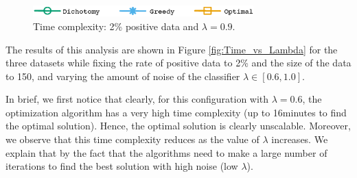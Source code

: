 


\begin{figure}[H]
\begin{centering}
\includegraphics[width=8.5cm]{imgs/legend2}
\par\end{centering}
\begin{centering}
\par\end{centering}
\caption{Time complexity: 2\% positive data and  $\lambda=0.9$.}
\label{fig:Time_vs_Data}
\end{figure}



  The results of this analysis are shown in Figure \ref{fig:Time_vs_Lambda} for the three datasets while fixing the rate of positive data to 2\% and the size of the data to 150, and varying the amount of noise of the classifier $\lambda \in [0.6,1.0]$.

In brief, we first notice that clearly, for this configuration with $\lambda=0.6$, the optimization algorithm has a very high time complexity (up to 16minutes to find the optimal solution). Hence, the optimal solution is clearly unscalable. Moreover, we observe that this time complexity reduces as the value of $\lambda$ increases. We explain that by the fact that the algorithms need to make a large number of iterations to find the best solution with high noise (low $\lambda$).



